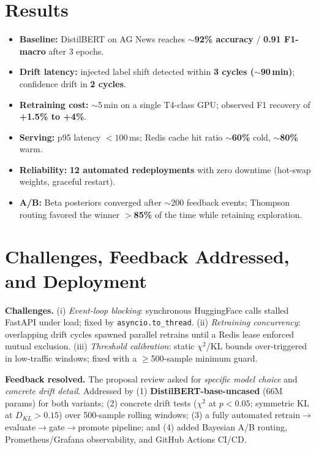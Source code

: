 \documentclass[11pt, a4paper]{article}
\begin{document}
\section{Results}
\begin{itemize}
    \item \textbf{Baseline:} DistilBERT on AG News reaches $\sim$\textbf{92\% accuracy} / \textbf{0.91 F1-macro} after 3 epochs.
    \item \textbf{Drift latency:} injected label shift detected within \textbf{3 cycles ($\sim$90\,min)}; confidence drift in \textbf{2 cycles}.
    \item \textbf{Retraining cost:} $\sim$5\,min on a single T4-class GPU; observed F1 recovery of \textbf{+1.5\% to +4\%}.
    \item \textbf{Serving:} p95 latency $<100$\,ms; Redis cache hit ratio $\sim$\textbf{60\%} cold, $\sim$\textbf{80\%} warm.
    \item \textbf{Reliability:} \textbf{12 automated redeployments} with zero downtime (hot-swap weights, graceful restart).
    \item \textbf{A/B:} Beta posteriors converged after $\sim$200 feedback events; Thompson routing favored the winner $>$\textbf{85\%} of the time while retaining exploration.
\end{itemize}

\section{Challenges, Feedback Addressed, and Deployment}

\textbf{Challenges.} (i) \emph{Event-loop blocking}: synchronous HuggingFace calls stalled FastAPI under load; fixed by \texttt{asyncio.to\_thread}. (ii) \emph{Retraining concurrency}: overlapping drift cycles spawned parallel retrains until a Redis lease enforced mutual exclusion. (iii) \emph{Threshold calibration}: static $\chi^2$/KL bounds over-triggered in low-traffic windows; fixed with a $\geq$500-sample minimum guard.

\textbf{Feedback resolved.} The proposal review asked for \emph{specific model choice} and \emph{concrete drift detail}. Addressed by (1) \textbf{DistilBERT-base-uncased} (66M params) for both variants; (2) concrete drift tests ($\chi^2$ at $p<0.05$; symmetric KL at $D_{KL}>0.15$) over 500-sample rolling windows; (3) a fully automated retrain$\to$evaluate$\to$gate$\to$promote pipeline; and (4) added Bayesian A/B routing, Prometheus/Grafana observability, and GitHub Actions CI/CD.
\end{document}
